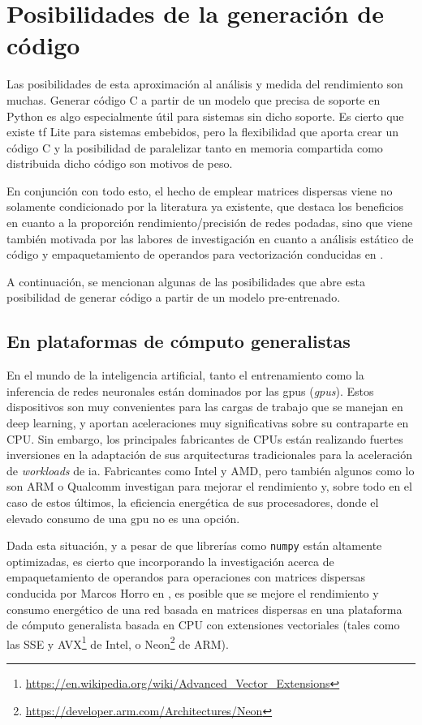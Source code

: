 \section{Posibilidades de la generación de código}
\label{sec:posibilidades_de_la_generacion_de_codigo}
Las posibilidades de esta aproximación al análisis y medida del rendimiento son muchas. Generar código C a partir de un modelo que precisa de soporte en Python es algo especialmente útil para sistemas sin dicho soporte. Es cierto que existe \acrlong{tf} Lite para sistemas embebidos, pero la flexibilidad que aporta crear un código C y la posibilidad de paralelizar tanto en memoria compartida como distribuida dicho código son motivos de peso.

En conjunción con todo esto, el hecho de emplear matrices dispersas viene no solamente condicionado por la literatura ya existente, que destaca los beneficios en cuanto a la proporción rendimiento/precisión de redes podadas, sino que viene también motivada por las labores de investigación en cuanto a análisis estático de código y empaquetamiento de operandos para vectorización conducidas en \cite{custom_high_performance_vector_codegen_sparse_computations}.

A continuación, se mencionan algunas de las posibilidades que abre esta posibilidad de generar código a partir de un modelo pre-entrenado.

\subsection{En plataformas de cómputo generalistas}
\label{ssec:posibilidades_en_computo_generalistas}
En el mundo de la inteligencia artificial, tanto el entrenamiento como la inferencia de redes neuronales están dominados por las \acrshort{gpu}s (\textit{\acrlong{gpu}s}). Estos dispositivos son muy convenientes para las cargas de trabajo que se manejan en deep learning, y aportan aceleraciones muy significativas sobre su contraparte en CPU. Sin embargo, los principales fabricantes de CPUs están realizando fuertes inversiones en la adaptación de sus arquitecturas tradicionales para la aceleración de \textit{workloads} de \acrshort{ia}. Fabricantes como Intel y AMD, pero también algunos como lo son ARM o Qualcomm investigan para mejorar el rendimiento y, sobre todo en el caso de estos últimos, la eficiencia energética de sus procesadores, donde el elevado consumo de una \acrshort{gpu} no es una opción.

Dada esta situación, y a pesar de que librerías como \texttt{numpy} están altamente optimizadas, es cierto que incorporando la investigación acerca de empaquetamiento de operandos para operaciones con matrices dispersas conducida por Marcos Horro en \cite{horro2022manycore}, es posible que se mejore el rendimiento y consumo energético de una red basada en matrices dispersas en una plataforma de cómputo generalista basada en CPU con extensiones vectoriales (tales como las SSE y AVX\footnote{\url{https://en.wikipedia.org/wiki/Advanced\_Vector\_Extensions}} de Intel, o Neon\footnote{\url{https://developer.arm.com/Architectures/Neon}} de ARM).

